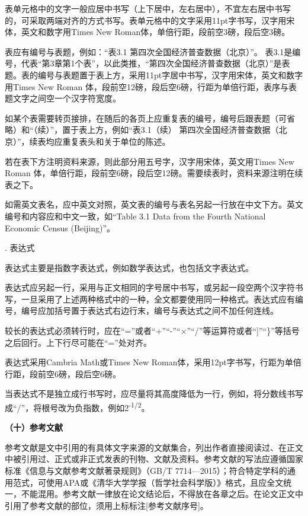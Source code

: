 \documentclass{Diploma}
\begin{document}
\begin{}
表单元格中的文字一般应居中书写（上下居中，左右居中），不宜左右居中书写的，可采取两端对齐的方式书写。表单元格中的文字采用11pt字书写，汉字用宋体，英文和数字用Times New Roman体，单倍行距，段前空3磅，段后空3磅。

表应有编号与表题，例如：“表3.1 第四次全国经济普查数据（北京）”。 表3.1是编号，代表“第3章第1个表”，以此类推，“第四次全国经济普查数据（北京）”是表题。表的编号与表题置于表上方，采用11pt字居中书写，汉字用宋体，英文和数字用Times New Roman 体，段前空12磅，段后空6磅，行距为单倍行距，表序与表题文字之间空一个汉字符宽度。

如某个表需要转页接排，在随后的各页上应重复表的编号，编号后跟表题（可省略）和“（续）”，置于表上方，例如“表3.1（续） 第四次全国经济普查数据（北京）”，续表均应重复表头和关于单位的陈述。

若在表下方注明资料来源，则此部分用五号字，汉字用宋体，英文用Times New Roman 体，单倍行距，段前空6磅，段后空12磅。需要续表时，资料来源注明在续表之下。

如需英文表名，应中英文对照，英文表的编号与表名另起一行放在中文下方。英文编号和内容应和中文一致，如“Table 3.1 Data from the Fourth National Economic Census (Beijing)”。

. 表达式

表达式主要是指数字表达式，例如数学表达式，也包括文字表达式。

表达式应另起一行，采用与正文相同的字号居中书写，或另起一段空两个汉字符书写，一旦采用了上述两种格式中的一种，全文都要使用同一种格式。表达式应有编号，编号应加括号置于表达式右边行末，编号与表达式之间不加任何连线。

较长的表达式必须转行时，应在“=”或者“+”“-”“×”“/”等运算符或者“]”“\}”等括号之后回行。上下行尽可能在“=”处对齐。

表达式采用Cambria Math或Times New Roman体，采用12pt字书写，行距为单倍行距，段前空6磅，段后空6磅。

当表达式不是独立成行书写时，应尽量将其高度降低为一行，例如，将分数线书写成“/”，将根号改为负指数，例如2\textsuperscript{-1/2}。

\noindent\textbf{（十）参考文献}

参考文献是文中引用的有具体文字来源的文献集合，列出作者直接阅读过、在正文中被引用过、正式或非正式发表的刊物、文献及资料。参考文献的写法应遵循国家标准《信息与文献参考文献著录规则》（GB/T 7714—2015）；符合特定学科的通用范式，可使用APA或《清华大学学报（哲学社会科学版）》格式，且应全文统一，不能混用。参考文献一律放在论文结论后，不得放在各章之后。在论文正文中引用了参考文献的部位，须用上标标注[参考文献序号]。


\end{}
\end{document}
